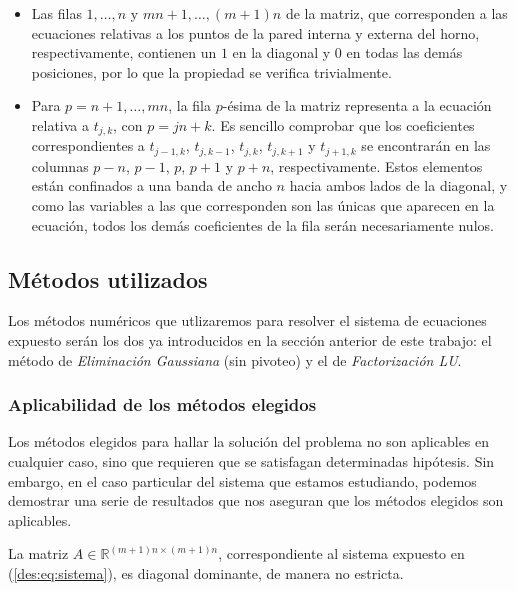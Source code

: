     \begin{itemize}
      \item Las filas $1, \dots, n$ y $mn + 1, \dots, (m+1)n$ de la matriz, que corresponden a las ecuaciones relativas a los puntos de la pared interna y externa del horno, respectivamente, contienen un $1$ en la diagonal y $0$ en todas las demás posiciones, por lo que la propiedad se verifica trivialmente.
      \item Para $p = n + 1, \dots, mn$, la fila $p$-ésima de la matriz representa a la ecuación relativa a $t_{j,k}$, con $p = jn+k$. Es sencillo comprobar que los coeficientes correspondientes a $t_{j-1,k}$, $t_{j,k-1}$, $t_{j,k}$, $t_{j,k+1}$ y $t_{j+1,k}$ se encontrarán en las columnas $p-n$, $p-1$, $p$, $p+1$ y $p+n$, respectivamente. Estos elementos están confinados a una banda de ancho $n$ hacia ambos lados de la diagonal, y como las variables a las que corresponden son las únicas que aparecen en la ecuación, todos los demás coeficientes de la fila serán necesariamente nulos.
    \end{itemize}

  \subsection{Métodos utilizados}

    Los métodos numéricos que utlizaremos para resolver el sistema de ecuaciones expuesto serán los dos ya introducidos en la sección anterior de este trabajo: el método de \emph{Eliminación Gaussiana} (sin pivoteo) y el de \emph{Factorización LU}.

    \subsubsection{Aplicabilidad de los métodos elegidos}
       Los métodos elegidos para hallar la solución del problema no son aplicables en cualquier caso, sino que requieren que se satisfagan determinadas hipótesis. Sin embargo, en el caso particular del sistema que estamos estudiando, podemos demostrar una serie de resultados que nos aseguran que los métodos elegidos son aplicables.

      \begin{prop} \label{prop:La matriz es diagonal dominante}
        La matriz $A \in \mathbb{R}^{(m+1)n \times (m+1)n}$, correspondiente al sistema expuesto en (\ref{des:eq:sistema}), es diagonal dominante, de manera no estricta.
      \end{prop}

